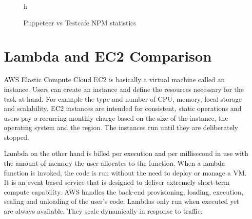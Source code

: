 \documentclass[12pt,a4paper,titlepage]{report}
\begin{document}
\begin{figure}{h}
 \centering
 \qquad
 \caption{Puppeteer vs Testcafe NPM statistics}
\end{figure}

\section{Lambda and EC2 Comparison}

AWS Elastic Compute Cloud \ac{EC2} is basically a virtual machine called an instance. Users can create an instance and define
the resources necessary for the task at hand. For example the type and number of CPU, memory, local storage and scalability. EC2 instances
are intended for consistent, static operations and users pay a recurring monthly charge based on the size of the instance, the operating
system and the region. The instances run until they are deliberately stopped.

Lambda on the other hand is billed per execution and per millisecond in use with the amount of memory the user allocates to the function.
When a lambda function is invoked, the code is run without the need to deploy or manage a \ac{VM}. It is an event based service that is
designed to deliver extremely short-term compute capability. AWS handles the back-end provisioning, loading, execution, scaling and unloading of the user's code.
Lambdas only run when executed yet are always available. They scale dynamically in response to traffic.
\end{document}
